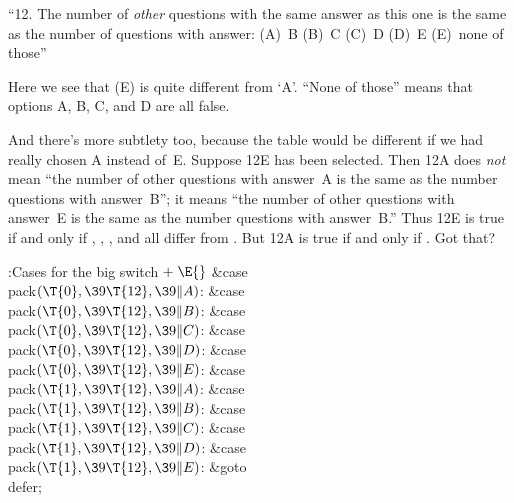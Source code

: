 ``12. The number of {\it other\/} questions with the same answer as this
one
is the same as the number of questions with answer:
(A)~B (B)~C (C)~D (D)~E (E)~none of those''

Here we see that (E) is quite different from `A'. ``None of those'' means
that options A, B, C, and D are all false.

And there's more subtlety too, because the  table would be
different if
we had really chosen A instead of~E\null. Suppose 12E has been selected.
Then 12A does {\it not\/} mean ``the number of other questions
with answer~A is the same as the number questions with answer~B''; it means
``the number of other questions
with answer~E is the same as the number questions with answer~B.''
Thus 12E is true if and only if , , ,
and  all differ from . But 12A is
true if and only if
. Got that?

\Y\B\4:Cases for the big switch\X${}\mathrel+\E{}$\6
\4\&{case} \\{pack}${}(\T{0},\39\T{12},\39\|A){}$:\5
\&{case} \\{pack}${}(\T{0},\39\T{12},\39\|B){}$:\5
\&{case} \\{pack}${}(\T{0},\39\T{12},\39\|C){}$:\5
\&{case} \\{pack}${}(\T{0},\39\T{12},\39\|D){}$:\5
\&{case} \\{pack}${}(\T{0},\39\T{12},\39\|E){}$:\5
\&{case} \\{pack}${}(\T{1},\39\T{12},\39\|A){}$:\5
\&{case} \\{pack}${}(\T{1},\39\T{12},\39\|B){}$:\5
\&{case} \\{pack}${}(\T{1},\39\T{12},\39\|C){}$:\5
\&{case} \\{pack}${}(\T{1},\39\T{12},\39\|D){}$:\5
\&{case} \\{pack}${}(\T{1},\39\T{12},\39\|E){}$:\5
\&{goto} \\{defer};\par
\fi

